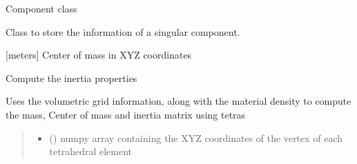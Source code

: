 \documentclass[letterpaper,10pt,english]{sphinxmanual}
\begin{document}
\begin{fulllineitems}
\label{\detokenize{modules:component.Component}}
\pysigstartsignatures
{}
\pysigstopsignatures
\sphinxAtStartPar
Component class

\sphinxAtStartPar
Class to store the information of a singular component.

\begin{fulllineitems}
\label{\detokenize{modules:component.Component.COG}}
\pysigstartsignatures
{}
\pysigstopsignatures
\sphinxAtStartPar
{[}meters{]} Center of mass in XYZ coordinates

\end{fulllineitems}


\begin{fulllineitems}
\label{\detokenize{modules:component.Component.compute_mass_properties}}
\pysigstartsignatures
{}
\pysigstopsignatures
\sphinxAtStartPar
Compute the inertia properties

\sphinxAtStartPar
Uses the volumetric grid information, along with the material density to compute the mass,
Center of mass and inertia matrix using tetras
\begin{quote}\begin{description}
\begin{itemize}
\item {} 
\sphinxAtStartPar
{} () \textendash{} numpy array containing the XYZ coordinates of the vertex of each tetrahedral element


\end{itemize}
\end{description}
\end{quote}
\end{fulllineitems}
\end{fulllineitems}
\end{document}
